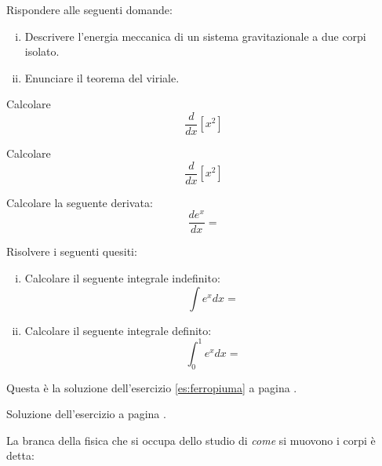 \documentclass[a4paper, 10pt]{extarticle}
\begin{document}
\begin{esercizio}[diff=3, partialpt]\label{es:meccanica}
Rispondere alle seguenti domande:
\begin{enumerate}[(i)]
\item{} Descrivere l'energia meccanica di un sistema gravitazionale a due corpi isolato.
\item{} Enunciare il teorema del viriale.
\end{enumerate}
\end{esercizio}

\begin{esercizio*}[label=Domanda, pt=2, diff=1]
Calcolare
\[
\frac{d}{dx}\left[ x^2\right]
\]
\end{esercizio*}

\setlength{\ptrulerlength}{.5cm}
\begin{esercizio}[pt=2]
Calcolare
\[
\frac{d}{dx}\left[ x^2\right]
\]
\end{esercizio}

\ptdelimiters{[]}
\begin{esercizio}[pt=2]\label{es:derivata}
Calcolare la seguente derivata:
\[
\frac{d e^x}{dx} = 
\]
\end{esercizio}

\partialptdelimiters{{}{}}
\begin{esercizio}
Risolvere i seguenti quesiti:
\begin{enumerate}[(i)]
\item{}\noindent Calcolare il seguente integrale indefinito:
\[
\int e^x dx = 
\]
\item{}\noindent Calcolare il seguente integrale definito:
\[
\int_0^1 e^x dx = 
\]
\end{enumerate}
\end{esercizio}


\begin{soluzione}
Questa è la soluzione dell'esercizio \ref{es:ferropiuma} a pagina \pageref{es:ferropiuma}.
\end{soluzione}

\begin{soluzione}[label={Soluzione dell'esercizio \ref{es:ferropiuma}}]
Soluzione dell'esercizio a pagina \pageref{es:ferropiuma}.
\end{soluzione}



\begin{esercizio}
La branca della fisica che si occupa dello studio di \emph{come} si muovono i corpi è detta: 
\end{esercizio}
\end{document}
